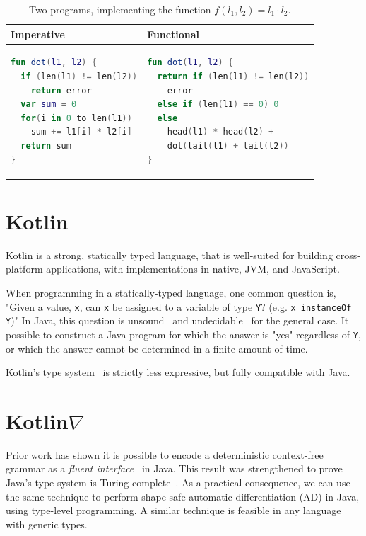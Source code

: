 \documentclass[12pt,initial,twoside,maitrise]{dms}
\numberwithin{equation}{section}
\numberwithin{table}{chapter}
\numberwithin{figure}{chapter}
\begin{document}
\begin{table}[t]
    \centering
    \begin{tabular}{|l|l|}
        \hline
        Imperative & Functional \\
        \hline
        \begin{lstlisting}[language=Kotlin, linewidth=5.5cm]
fun dot(l1, l2) {
  if (len(l1) != len(l2))
    return error
  var sum = 0
  for(i in 0 to len(l1))
    sum += l1[i] * l2[i]
  return sum
}
        \end{lstlisting}
         &
        \begin{lstlisting}[language=Kotlin, linewidth=5.5cm]
fun dot(l1, l2) {
  return if (len(l1) != len(l2))
    error
  else if (len(l1) == 0) 0
  else
    head(l1) * head(l2) +
    dot(tail(l1) + tail(l2))
}
        \end{lstlisting} \\
        \hline
    \end{tabular}
    \caption{Two programs, implementing the function $f(l_1, l_2) = l_1 \cdot l_2$.}
    \label{tab:1}
\end{table}

\section{Kotlin}\label{sec:kotlin}

Kotlin is a strong, statically typed language, that is well-suited for building cross-platform applications, with implementations in native, JVM, and JavaScript.

When programming in a statically-typed language, one common question is, "Given a value, \texttt{x}, can \texttt{x} be assigned to a variable of type \texttt{Y}? (e.g. \texttt{x instanceOf Y})" In Java, this question is unsound~\cite{amin2016java} and undecidable~\cite{Grigore:2017:JGT:3009837.3009871} for the general case. It possible to construct a Java program for which the answer is "yes" regardless of \texttt{Y}, or which the answer cannot be determined in a finite amount of time.

Kotlin's type system~\cite{tate2013mixed} is strictly less expressive, but fully compatible with Java.

\section{Kotlin$\nabla$}\label{sec:kotlingrad}

Prior work has shown it is possible to encode a deterministic context-free grammar as a \textit{fluent interface}~\cite{gil2016formal} in Java. This result was strengthened to prove Java's type system is Turing complete~\cite{Grigore:2017:JGT:3009837.3009871}. As a practical consequence, we can use the same technique to perform shape-safe automatic differentiation (AD) in Java, using type-level programming. A similar technique is feasible in any language with generic types.
\end{document}
